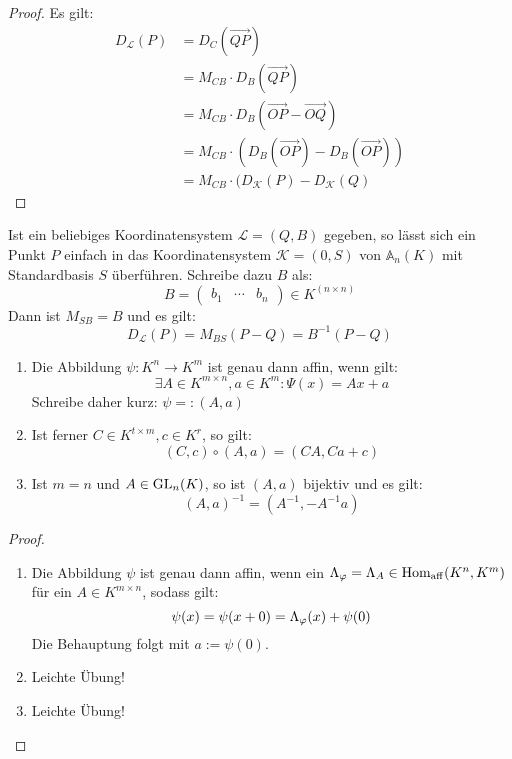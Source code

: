 \documentclass[parskip,a4paper,twoside,DIV15,BCOR12mm]{scrbook}
\begin{document}
\begin{proof}
Es gilt:
\begin{align*}
D_\mathcal{L}(P)&=D_C(\overrightarrow{QP})\\
&=M_{CB}\cdot D_B(\overrightarrow{QP})\\
&=M_{CB}\cdot D_B(\overrightarrow{OP}-\overrightarrow{OQ})\\
&=M_{CB}\cdot (D_B(\overrightarrow{OP})-D_B(\overrightarrow{OP}))\\
&=M_{CB}\cdot(D_\mathcal{K}(P)-D_\mathcal{K}(Q)
\end{align*}
\end{proof}

\begin{application}
Ist ein beliebiges Koordinatensystem $\mathcal{L}=(Q,B)$ gegeben, so lässt sich ein 
Punkt $P$ einfach in das Koordinatensystem $\mathcal{K}=(0,S)$ von $\mathbb{A}_n(K)$ 
mit Standardbasis $S$ überführen. Schreibe dazu $B$ als:
\[B=\begin{pmatrix}b_1&\cdots &b_n\end{pmatrix}\in K^{(n\times n)}\]
Dann ist $M_{SB}=B$ und es gilt:
\[D_\mathcal{L}(P)=M_{BS}(P-Q)=B^{-1}(P-Q)\]
\end{application}

\begin{lemma}
\begin{enumerate}
\item Die Abbildung $\psi:K^n\to K^m$ ist genau dann affin, wenn gilt:
\[\exists A\in K^{m\times n},a\in K^m:\Psi(x)=Ax+a\]
Schreibe daher kurz: $\psi=:(A,a)$
\item Ist ferner $C\in K^{t\times m},c\in K^r$, so gilt:
\[(C,c)\circ(A,a)=(CA,Ca+c)\]
\item Ist $m=n$ und $A\in\operatorname{GL}_n(K)$, so ist $(A,a)$ bijektiv und es gilt:
\[(A,a)^{-1}=(A^{-1},-A^{-1}a)\]
\end{enumerate}
\end{lemma}

\begin{proof}
\begin{enumerate}
\item Die Abbildung $\psi$ ist genau dann affin, wenn ein $\Lambda_\varphi=\Lambda_A\in\operatorname{Hom_{aff}}
(K^n,K^m)$ für ein $A\in K^{m\times n}$, sodass gilt:
\[\psi(x)=\psi(x+0)=\Lambda_\varphi(x)+\psi(0)\]
Die Behauptung folgt mit $a:=\psi(0)$.
\item Leichte Übung!
\item Leichte Übung!
\end{enumerate}
\end{proof}
\end{document}
